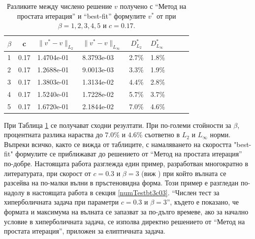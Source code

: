 \documentclass{article}
\theoremstyle{remark}
\begin{document}
\begin{table}[ht]
\centering
\begin{tabular}{|l|c|l l| c|l|c|l l|}
\hline 
\hline 
$\beta$	& c 	& $\|v^*-v \|_{L_2 }$ & $\|v^*-v \|_{L_\infty }$  	& $D^*_{L_2}$	& $D^*_{L_\infty }$	\\
\hline 
1& 		0.17&	1.4704e-01 		& 	8.3793e-03 				& 2.7\%			& 1.8\%		\\
\hline 
2& 		0.17&	1.2688e-01 		& 	9.0013e-03				& 3.3\%			& 1.9\%		\\
\hline 
3& 		0.17&	1.3803e-01 		& 	1.3134e-02				& 4.4\%			& 2.8\%		\\
\hline 
4& 		0.17&	 1.5240e-01 		& 	1.7228e-02				& 5.7\%			& 3.7\%		\\
\hline 
5& 		0.17&	1.6720e-01 		& 	2.1844e-02				& 7.0\%			& 4.6\%		\\
\hline 
\hline 
\end{tabular}
\caption{Разликите между числено решение $v$ получено с ``Метод на простата итерация'' и ``best-fit'' формулите $v^*$ от \cite{Ch2011} при $\beta=1, 2, 3, 4, 5$ и $c=0.17$.}
\label{tab:diff-c017}
\end{table}
При Таблица \ref{tab:diff-c017} се получават сходни резултати. При по-големи стойности за $\beta$, процентната разлика нараства до $7.0\%$ и $4.6\%$ съответно в $L_2$ и $L_\infty$ норми. Въпреки всичко, както се вижда от таблиците, с намаляването на скоростта "best-fit" формулите се приближават до решението от ``Метод на простата итерация'' по-добре. Настоящата работа разглежда един пример, разработван многократно в литературата, при скорост от $c=0.3$ и $\beta = 3$ (виж \cite{ref21, dani, milenaDani, ref22}) при който вълната се разсейва на по-малки вълни в пръстеновидна форма. Този пример е разгледан по-надолу в настоящата работа в секция \ref{numTestbt3c03}. ``Числен тест за хиперболичната задача при параметри $c=0.3$ и $\beta = 3$'', където е показано, че формата и максимума на вълната се запазват за по-дълго времеве, ако за начално условие в хиперболичната задача, се изполва директно решението от ``Метод на простата итерация'', приложен за елиптичната задача. 
\end{document}
